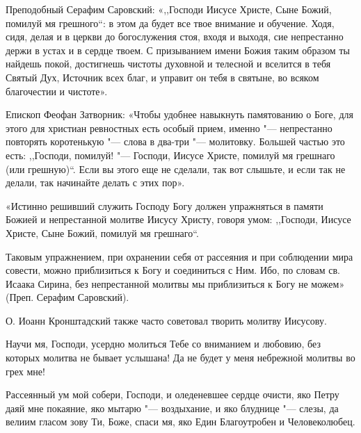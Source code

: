 {{Преподобный Серафим Саровский: «,,Господи Иисусе Христе, Сыне Божий, помилуй мя грешного``:  в этом да будет все твое внимание и обучение. Ходя, сидя, делая и в церкви до богослужения стоя, входя и выходя, сие непрестанно держи в устах и в сердце твоем. С призыванием имени Божия таким образом ты найдешь покой, достигнешь чистоты духовной и телесной и вселится в тебя Святый Дух, Источник всех благ, и управит он тебя в святыне, во всяком благочестии и чистоте». 

Епископ Феофан Затворник: «Чтобы удобнее навыкнуть памятованию о Боге, для этого для христиан ревностных есть особый прием, именно "--- непрестанно повторять коротенькую "--- слова в два-три "--- молитовку. Большей частью это есть: ,,Господи, помилуй! "--- Господи, Иисусе Христе, помилуй мя грешнаго (или грешную)``. Если вы этого еще не сделали, так вот слышьте, и если так не делали, так начинайте делать с этих пор». 

«Истинно решивший служить Господу Богу должен упражняться в памяти Божией и непрестанной молитве Иисусу Христу, говоря умом: ,,Господи, Иисусе Христе, Сыне Божий, помилуй мя грешнаго``. 

Таковым упражнением, при охранении себя от рассеяния и при соблюдении мира совести, можно приблизиться к Богу и соединиться с Ним. Ибо, по словам св. Исаака Сирина, без непрестанной молитвы мы приблизиться к Богу не можем» (Преп. Серафим Саровский). 

О. Иоанн Кронштадский также часто советовал творить молитву Иисусову.


\longpage[2]{}\mychapterending[1]

 





Научи мя, Господи, усердно молиться Тебе со вниманием и любовию, без которых молитва не бывает услышана! Да не будет у меня небрежной молитвы во грех мне!

 


\mychapterending

 





Рассеянный ум мой собери, Господи, и оледеневшее сердце очисти, яко Петру даяй мне покаяние, яко мытарю "--- воздыхание, и яко блуднице "--- слезы, да велиим гласом зову Ти, Боже, спаси мя, яко Един Благоутробен и Человеколюбец. 




}}

